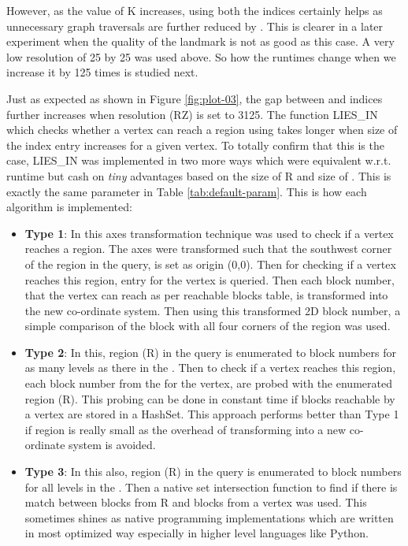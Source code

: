However, as the value of K increases, using both the indices certainly helps as unnecessary graph traversals are further reduced by {\rrpspatial}. This is clearer in a later experiment when the quality of the landmark is not as good as this case. A very low resolution of 25 by 25 was used above. So how the runtimes change when we increase it by 125 times is studied next.

Just as expected as shown in Figure \ref{fig:plot-03}, the gap between {\rrp} and {\rrpsocial} indices further increases when resolution (RZ) is set to 3125. The function LIES\_IN which checks whether a vertex can reach a region using {\rrpspatial} takes longer when size of the index entry increases for a given vertex. To totally confirm that this is the case, LIES\_IN was implemented in two more ways which were equivalent w.r.t. runtime but cash on \textit{tiny} advantages based on the size of R and size of {\rrpspatial}. This is exactly the same parameter {\vra} in Table \ref{tab:default-param}. This is how each algorithm is implemented:
\begin{itemize}
  \item \textbf{Type 1}: In this axes transformation technique was used to check if a vertex reaches a region. The axes were transformed such that the southwest corner of the region in the query, is set as origin (0,0). Then for checking if a vertex reaches this region, {\rrpspatial} entry for the vertex is queried. Then each block number, that the vertex can reach as per reachable blocks table, is transformed into the new co-ordinate system. Then using this transformed 2D block number, a simple comparison of the block with all four corners of the region was used.
  \item \textbf{Type 2}: In this, region (R) in the query is enumerated to block numbers for as many levels as there in the {\rrpspatial}. Then to check if a vertex reaches this region, each block number from the {\rrpspatial} for the vertex, are probed with the enumerated region (R). This probing can be done in constant time if blocks reachable by a vertex are stored in a HashSet. This approach performs better than Type 1 if region is really small as the overhead of transforming into a new co-ordinate system is avoided.
  \item \textbf{Type 3}: In this also, region (R) in the query is enumerated to block numbers for all levels in the {\rrpspatial}. Then a native set intersection function to find if there is match between blocks from R and blocks from a vertex was used. This sometimes shines as native programming implementations which are written in most optimized way especially in higher level languages like Python.
\end{itemize}

